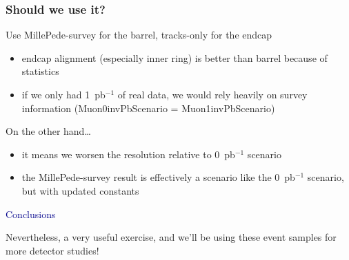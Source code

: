 \documentclass[compress]{beamer}
\begin{document}
\begin{frame}
\frametitle{Should we use it?}

Use MillePede-survey for the barrel, tracks-only for the endcap

\begin{itemize}\setlength{\itemsep}{0.25 cm}
\item endcap alignment (especially inner ring) is better than barrel because of statistics
\item if we only had 1~pb$^{-1}$ of real data, we would rely heavily on survey information (Muon0invPbScenario = Muon1invPbScenario)
\end{itemize}

\vfill
On the other hand\ldots
\begin{itemize}\setlength{\itemsep}{0.25 cm}
\item it means we worsen the resolution relative to 0~pb$^{-1}$ scenario
\item the MillePede-survey result is effectively a scenario like the
0~pb$^{-1}$ scenario, but with updated constants
\end{itemize}

\vfill
\hspace{-0.83 cm} \textcolor{darkblue}{\Large Conclusions}

\vfill Nevertheless, a very useful exercise, and we'll be using these event samples for more detector studies!

\label{numpages}
\end{frame}
\end{document}
